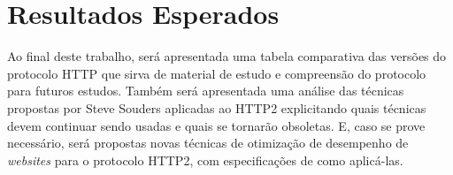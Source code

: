 %
%

\chapter{Resultados Esperados}

Ao final deste trabalho, será apresentada uma tabela comparativa das versões do protocolo HTTP que sirva de material de estudo e compreensão do protocolo para futuros estudos. Também será apresentada uma análise das técnicas propostas por Steve Souders aplicadas ao HTTP2 explicitando quais técnicas devem continuar sendo usadas e quais se tornarão obsoletas. E, caso se prove necessário, será propostas novas técnicas de otimização de desempenho de \textit{websites} para o protocolo HTTP2, com especificações de como aplicá-las.